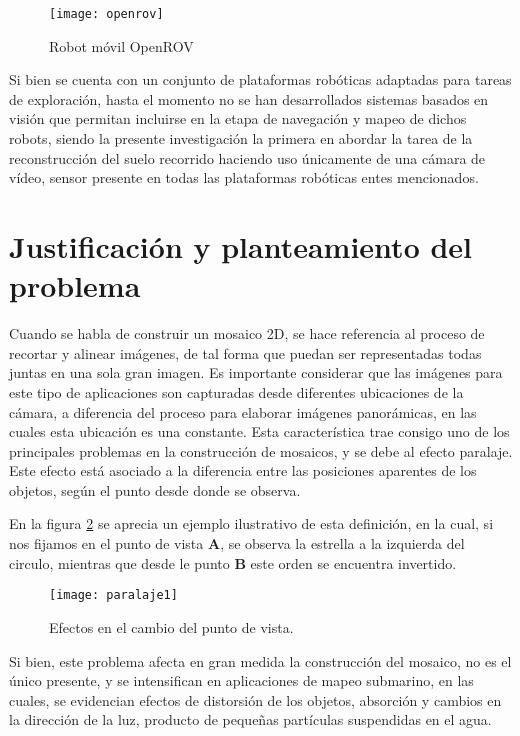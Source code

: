 \begin{figure}[H]
	\centering
	\texttt{[image: openrov]}
	\caption{Robot móvil OpenROV}
	\label{imagen:openrov}
\end{figure}
Si bien se cuenta con un conjunto de plataformas robóticas adaptadas para tareas de exploración, hasta el momento no se han desarrollados sistemas basados en visión que permitan incluirse en la etapa de navegación y mapeo de dichos robots, siendo la presente investigación la primera en abordar la tarea de la reconstrucción del suelo recorrido haciendo uso únicamente de una cámara de vídeo, sensor presente en todas las plataformas robóticas entes mencionados.

\section{Justificación y planteamiento del problema}


Cuando se habla de construir un mosaico 2D, se hace referencia al proceso de recortar y alinear imágenes, de tal forma que puedan ser representadas todas juntas en una sola gran imagen. Es importante considerar que las imágenes para este tipo de aplicaciones son capturadas desde diferentes ubicaciones de la cámara, a diferencia del proceso para elaborar imágenes panorámicas, en las cuales esta ubicación es una constante. Esta característica trae consigo uno de los principales problemas en la construcción de mosaicos, y se debe al efecto paralaje. Este efecto está asociado a la diferencia entre las posiciones aparentes de los objetos, según el punto desde donde se observa.

En la figura \ref{imagen:paralaje} se aprecia un ejemplo ilustrativo de esta definición, en la cual, si nos fijamos en el punto de vista \textbf{A}, se observa la estrella a la izquierda del circulo, mientras que desde le punto \textbf{B} este orden se encuentra invertido. 

\begin{figure}[H]
	\centering
	\texttt{[image: paralaje1]}
	\caption[Efectos en el cambio del punto de vista]{Efectos en el cambio del punto de vista.}
	\label{imagen:paralaje}
\end{figure}

Si bien, este problema afecta en gran medida la construcción del mosaico, no es el único presente, y se intensifican en aplicaciones de mapeo submarino, en las cuales, se evidencian efectos de distorsión de los objetos, absorción y cambios en la dirección de la luz, producto de pequeñas partículas suspendidas en el agua.


